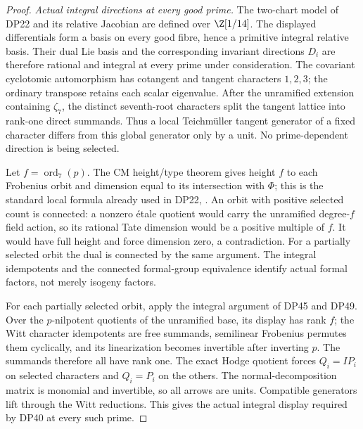 \begin{proof}
\emph{Actual integral directions at every good prime.}
The two-chart model of DP22 and its relative Jacobian are defined over $\Z[1/14]$. The displayed differentials form a basis on every good fibre, hence a primitive integral relative basis. Their dual Lie basis and the corresponding invariant directions $D_i$ are therefore rational and integral at every prime under consideration.
The covariant cyclotomic automorphism has cotangent and tangent characters $1,2,3$; the ordinary transpose retains each scalar eigenvalue.
After the unramified extension containing $\zeta_7$, the distinct seventh-root characters split the tangent lattice into rank-one direct summands. Thus a local Teichm\"uller tangent generator of a fixed character differs from this global generator only by a unit. No prime-dependent direction is being selected.

Let $f=\operatorname{ord}_7(p)$. The CM height/type theorem gives height $f$ to each Frobenius orbit and dimension equal to its intersection with $\Phi$; this is the standard local formula already used in DP22, \cite[\S5, (10*) and Theorem 3, pp.~106--108]{Tate352}.
An orbit with positive selected count is connected: a nonzero \'etale quotient would carry the unramified degree-$f$ field action, so its rational Tate dimension would be a positive multiple of $f$. It would have full height and force dimension zero, a contradiction. For a partially selected orbit the dual is connected by the same argument.
The integral idempotents and the connected formal-group equivalence identify actual formal factors, not merely isogeny factors.

For each partially selected orbit, apply the integral argument of DP45 and DP49. Over the $p$-nilpotent quotients of the unramified base, its display has rank $f$; the Witt character idempotents are free summands, semilinear Frobenius permutes them cyclically, and its linearization becomes invertible after inverting $p$. The summands therefore all have rank one. The exact Hodge quotient forces $Q_i=IP_i$ on selected characters and $Q_i=P_i$ on the others. The normal-decomposition matrix is monomial and invertible, so all arrows are units. Compatible generators lift through the Witt reductions. This gives the actual integral display required by DP40 at every such prime.


\end{proof}
